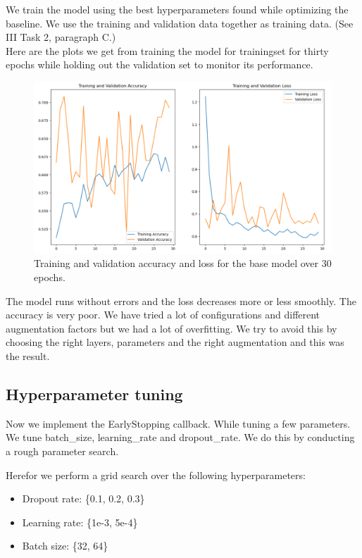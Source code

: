 \documentclass[conference]{IEEEtran}
\begin{document}
We train the model using the best hyperparameters found while optimizing the
baseline. We use the training and validation data together as training data. 
(See III Task 2, paragraph C.)\\



Here are the plots we get from training the model for trainingset for thirty epochs while holding out the
validation set to monitor its performance.\\

\begin{figure}[htbp]
	\centerline{\includegraphics[width=\linewidth]{Images/Transferlearning_1.png}}
	\caption{Training and validation accuracy and loss for the base model over 30 epochs.}
	\label{fig:baseline_curves}
\end{figure}

The model runs without errors and the loss decreases more or less smoothly. The accuracy is very poor. We have tried a lot of configurations and different augmentation factors but we had a lot of overfitting. We try to avoid this by choosing the right layers, parameters and the right augmentation and this was the result.\\



\subsection{Hyperparameter tuning}
Now we implement the EarlyStopping callback. While tuning a few parameters. We tune batch\_size, learning\_rate and dropout\_rate. We do this by conducting a rough parameter search.

Herefor we perform a grid search over the following hyperparameters:
\begin{itemize}
	\item Dropout rate: \{0.1, 0.2, 0.3\}
	\item Learning rate: \{1e-3, 5e-4\}
	\item Batch size: \{32, 64\}
\end{itemize}
\end{document}
